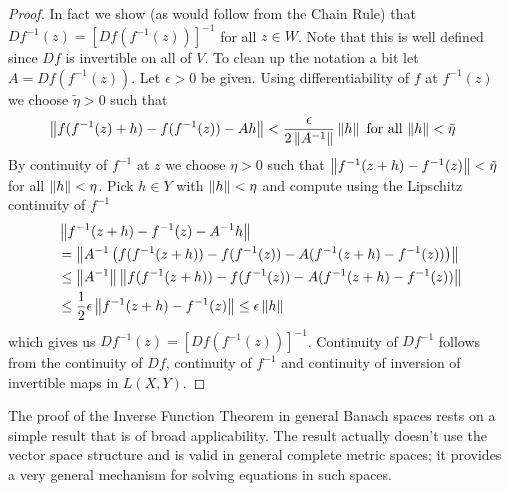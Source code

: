 \begin{proof}
In fact we show (as would follow from the Chain Rule) that $Df^{-1}
(z) = \left[ Df(f^{-1}(z) )\right]^{-1}$ for all $z \in W$.  Note that
this is well defined since $Df$ is invertible on all of $V$.  To clean
up the notation a bit let $A = Df(f^{-1}(z) )$.  Let $\epsilon > 0$ be
given.  Using differentiability of $f$ at $f^{-1}(z)$ we choose
$\tilde{\eta} > 0$ such that
\begin{align*}
\left \lVert f(f^{-1}(z) +
  h) -
  f(f^{-1}(z)) - Ah \right \rVert &< \frac{\epsilon}{2\left \lVert A^{-1} \right \rVert} \left \lVert h \right \rVert
                       \text{ for all $\left \lVert h \right \rVert < \tilde{\eta}$}
\end{align*}
By continuity of $f^{-1}$ at $z$ we choose $\eta > 0$ such that
$\left \lVert f^{-1}(z+h) - f^{-1}(z) \right \rVert < \tilde{\eta}$ for
all $\left \lVert h \right \rVert < \eta$.  Pick $h \in Y$ with $\left \lVert h \right \rVert<\eta$ and
compute using the Lipschitz continuity of $f^{-1}$
\begin{align*}
&\left \lVert f^{-1}(z + h) - f^{-1}(z) - A^{-1} h \right \rVert \\
&=\left \lVert A^{-1} \left(f(f^{-1}(z+h)) - f(f^{-1}(z)) - A(f^{-1}(z + h) -
                                              f^{-1}(z)) \right) \right \rVert \\
&\leq \left \lVert A^{-1} \right \rVert \left \lVert f(f^{-1}(z+h)) - f(f^{-1}(z)) - A(f^{-1}(z + h) -
                                              f^{-1}(z)) \right \rVert \\
&\leq \frac{1}{2} \epsilon \left \lVert f^{-1}(z + h) - f^{-1}(z) \right \rVert \leq \epsilon \left \lVert h \right \rVert 
\end{align*}
which gives us $Df^{-1}(z) = \left[ Df(f^{-1}(z) )\right]^{-1}$.
Continuity of $Df^{-1}$ follows from the continuity of $Df$,
continuity of $f^{-1}$ and continuity of inversion of invertible maps
in $L(X,Y)$.
\end{proof}

The proof of the Inverse Function Theorem in general Banach spaces
rests on a simple result that is of broad applicability.  The result
actually doesn't use the vector space structure and is valid in
general complete metric spaces; it provides a
very general mechanism for solving equations in such spaces.


